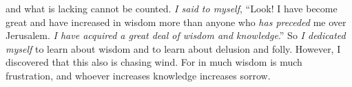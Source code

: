 \begin{biblechapter}
and what is lacking cannot be counted.
\verse \textit{I said to myself}, “Look! I have become great and have increased in wisdom more than anyone who \textit{has preceded} me over Jerusalem. \textit{I have acquired a great deal of wisdom and knowledge}.”
\verse So \textit{I dedicated myself} to learn about wisdom and to learn about delusion and folly. However, I discovered that this also is chasing wind.
\verse For in much wisdom is much frustration, 
and whoever increases knowledge increases sorrow.
\end{biblechapter}

